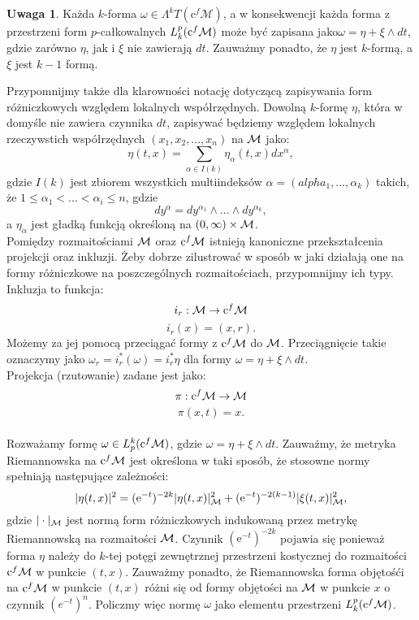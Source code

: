 \documentclass[licencjacka]{pracamgr}
\theoremstyle{definition}
\theoremstyle{definition}
\newtheorem{remark}{Uwaga}[section]
\theoremstyle{plain}
\theoremstyle{plain}
\def\cfm{\ensuremath\mathrm{c}^f\mathcal{M}}
\def\M{\ensuremath\mathcal{M}}
\begin{document}
\begin{remark}
Każda $k$-forma $\omega \in \Lambda^k T(\mathrm{c}^f \mathcal{M})$, 
a w konsekwencji każda forma z przestrzeni form $p$-całkowalnych  $L_k^p
(\cfm)$ może być zapisana jako$\omega = \eta + \xi \wedge dt$,
gdzie zarówno $\eta$, jak i  $\xi$ nie zawierają $dt$.  Zauważmy ponadto,
że $\eta$ jest $k$-formą, a $\xi$ jest $k-1$ formą. \\
\end{remark}

Przypomnijmy także dla klarowności notację dotyczącą zapisywania form różniczkowych
względem lokalnych współrzędnych. Dowolną $k$-formę $\eta$, która w domyśle nie zawiera
czynnika $dt$, zapisywać będziemy względem lokalnych rzeczywstich współrzędnych
$(x_1, x_2, ... , x_n)$ na $\M$ jako:
\[
    \eta(t, x) = \sum_{\alpha \in I(k)} \eta_\alpha (t, x) dx^\alpha,
\]
gdzie $I(k)$ jest zbiorem wszystkich multiindeksów $\alpha = (alpha_1, ...,
\alpha_k)$ takich, że $1 \leq \alpha_1 < ... < \alpha_i \leq n$, gdzie
\begin{equation}\label{notacja}
    dy^\alpha = dy^{\alpha_1} \wedge ... \wedge dy^{\alpha_k},
\end{equation}
a $\eta_\alpha$ jest gładką funkcją określoną na $(0, \infty) \times \M$. \\

Pomiędzy rozmaitościami $\M$ oraz $\cfm$ istnieją kanoniczne przekształcenia
projekcji oraz inkluzji. Żeby dobrze zilustrować w sposób w jaki działają one
na formy różniczkowe na poszczególnych rozmaitościach, przypomnijmy ich typy.
Inkluzja to funkcja:
\[
    i_r: \M \rightarrow \cfm \\
\]
\[
    i_r(x) = (x, r).
\]
Możemy za jej pomocą przeciągać formy z $\cfm$ do $\M$. Przeciągnięcie takie
oznaczymy jako $\omega_r = i_r^\ast(\omega) = i_r^\ast \eta $ dla formy $\omega
= \eta + \xi \wedge dt$. \\
Projekcja (rzutowanie) zadane jest jako:
\[
    \pi: \cfm \rightarrow \M
\]
\[
    \pi (x, t) = x.
\] \\


Rozważamy formę $\omega \in L^k_p (\cfm)$, gdzie
$\omega = \eta + \xi \wedge dt$.
Zauważmy, że metryka Riemannowska na $\cfm$ jest określona w taki sposób, że
stosowne normy spełniają następujące zależności:
$$
| \eta(t,x) |^2 = (\mathrm{e}^{-t})^{-2k} | \eta(t,x) |^2_{\M} +
(\mathrm{e}^{-t})^{-2(k-1)} | \xi(t,x) |^2_{\M},
$$
gdzie $|\cdot |_{\M} $ jest normą form różniczkowych indukowaną przez
metrykę Riemannowską na rozmaitości $\M$.  Czynnik $(\mathrm{e}^{-t})^{-2k}$
pojawia się ponieważ forma $\eta$ należy do $k$-tej potęgi zewnętrznej
przestrzeni kostycznej do rozmaitości $\cfm$ w punkcie $(t,x)$.  Zauważmy
ponadto, że Riemannowska forma objętośći na $\cfm$ w punkcie $(t,x)$ różni się
od formy objętości na $\M$ w punkcie $x$ o czynnik $(e^{-t})^n$.  Policzmy więc
normę $\omega$ jako elementu przestrzeni $L_k^p (\cfm)$.
\end{document}
